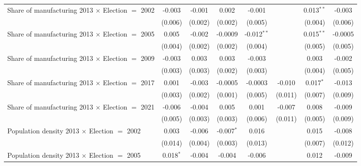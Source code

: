\begin{table}[htbp]
\begin{tabular}{lccccccc}
      Share of manufacturing 2013 $\times$ Election $=$ 2002  & -0.003        & -0.001       & 0.002          & -0.001        &                & 0.013$^{**}$   & -0.003\\   
                                                              & (0.006)       & (0.002)      & (0.002)        & (0.005)       &                & (0.004)        & (0.006)\\   
      Share of manufacturing 2013 $\times$ Election $=$ 2005  & 0.005         & -0.002       & -0.0009        & -0.012$^{**}$ &                & 0.015$^{**}$   & -0.0005\\   
                                                              & (0.004)       & (0.002)      & (0.002)        & (0.004)       &                & (0.005)        & (0.005)\\   
      Share of manufacturing 2013 $\times$ Election $=$ 2009  & -0.003        & 0.003        & 0.003          & -0.003        &                & 0.003          & -0.002\\   
                                                              & (0.003)       & (0.003)      & (0.002)        & (0.003)       &                & (0.004)        & (0.005)\\   
      Share of manufacturing 2013 $\times$ Election $=$ 2017  & 0.001         & -0.003       & -0.0005        & -0.0003       & -0.010         & 0.017$^{*}$    & -0.013\\   
                                                              & (0.003)       & (0.002)      & (0.001)        & (0.005)       & (0.011)        & (0.007)        & (0.009)\\   
      Share of manufacturing 2013 $\times$ Election $=$ 2021  & -0.006        & -0.004       & 0.005          & 0.001         & -0.007         & 0.008          & -0.009\\   
                                                              & (0.005)       & (0.003)      & (0.003)        & (0.006)       & (0.011)        & (0.005)        & (0.009)\\   
      Population density 2013 $\times$ Election $=$ 2002      & 0.003         & -0.006       & -0.007$^{*}$   & 0.016         &                & 0.015          & -0.008\\   
                                                              & (0.014)       & (0.004)      & (0.003)        & (0.013)       &                & (0.007)        & (0.012)\\   
      Population density 2013 $\times$ Election $=$ 2005      & 0.018$^{*}$   & -0.004       & -0.004         & -0.006        &                & 0.012          & -0.009\\   

\end{tabular}
\end{table}
